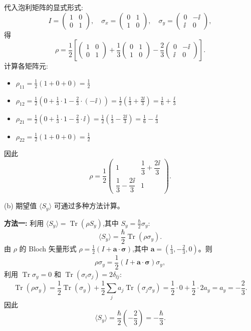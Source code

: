 \begin{question}
\begin{solution}
代入泡利矩阵的显式形式:
\[
I = \begin{pmatrix}1&0\\0&1\end{pmatrix},\quad
\sigma_x = \begin{pmatrix}0&1\\1&0\end{pmatrix},\quad
\sigma_y = \begin{pmatrix}0&-\ii\\\ii&0\end{pmatrix},
\]
得
\[
\rho = \frac{1}{2}\left[
\begin{pmatrix}1&0\\0&1\end{pmatrix}
+ \frac{1}{3}\begin{pmatrix}0&1\\1&0\end{pmatrix}
- \frac{2}{3}\begin{pmatrix}0&-\ii\\\ii&0\end{pmatrix}
\right].
\]
计算各矩阵元:
\begin{itemize}
\item $\rho_{11} = \frac{1}{2}(1 + 0 + 0) = \frac{1}{2}$
\item $\rho_{12} = \frac{1}{2}\left(0 + \frac{1}{3}\cdot 1 - \frac{2}{3}\cdot(-\ii)\right) = \frac{1}{2}\left(\frac{1}{3} + \frac{2\ii}{3}\right) = \frac{1}{6} + \frac{\ii}{3}$
\item $\rho_{21} = \frac{1}{2}\left(0 + \frac{1}{3}\cdot 1 - \frac{2}{3}\cdot \ii\right) = \frac{1}{2}\left(\frac{1}{3} - \frac{2\ii}{3}\right) = \frac{1}{6} - \frac{\ii}{3}$
\item $\rho_{22} = \frac{1}{2}(1 + 0 + 0) = \frac{1}{2}$
\end{itemize}
因此
\[
\boxed{\rho = \frac{1}{2}\begin{pmatrix}
1 & \dfrac{1}{3} + \dfrac{2\ii}{3}\\[6pt]
\dfrac{1}{3} - \dfrac{2\ii}{3} & 1
\end{pmatrix}.}
\]

(b) 期望值 $\langle S_y\rangle$ 可通过多种方法计算。

\textbf{方法一:} 利用 $\langle S_y\rangle = \operatorname{Tr}(\rho S_y)$,其中 $S_y = \frac{\hbar}{2}\sigma_y$:
\[
\langle S_y\rangle = \frac{\hbar}{2}\operatorname{Tr}(\rho\sigma_y).
\]
由 $\rho$ 的 Bloch 矢量形式 $\rho = \frac{1}{2}(I + \mathbf a\cdot\boldsymbol\sigma)$,其中 $\mathbf a = \left(\frac{1}{3}, -\frac{2}{3}, 0\right)$。则
\[
\rho\sigma_y = \frac{1}{2}(I + \mathbf a\cdot\boldsymbol\sigma)\sigma_y,
\]
利用 $\operatorname{Tr}\sigma_y = 0$ 和 $\operatorname{Tr}(\sigma_i\sigma_j)=2\delta_{\ii j}$:
\[
\operatorname{Tr}(\rho\sigma_y) = \frac{1}{2}\operatorname{Tr}(\sigma_y) + \frac{1}{2}\sum_j a_j\operatorname{Tr}(\sigma_j\sigma_y) = \frac{1}{2}\cdot 0 + \frac{1}{2}\cdot 2a_y = a_y = -\frac{2}{3}.
\]
因此
\[
\boxed{\langle S_y\rangle = \frac{\hbar}{2}\left(-\frac{2}{3}\right) = -\frac{\hbar}{3}.}
\]


\end{solution}
\end{question}
